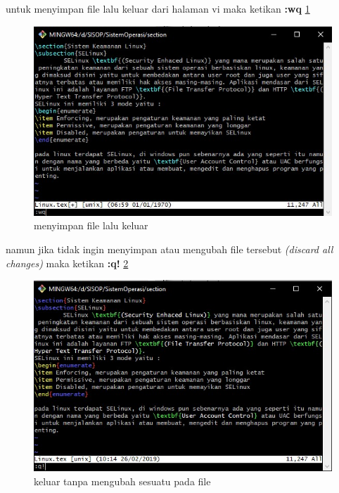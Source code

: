 \begin{enumerate}
\subitem untuk menyimpan file lalu keluar dari halaman vi maka ketikan \textbf{:wq} \ref{wq}
\begin{figure}[!htbp]
\centerline{\includegraphics[width=.75\textwidth]{Figures/vi4.jpg}}
\caption{menyimpan file lalu keluar}
\label{wq}
\end{figure}

\subitem namun jika tidak ingin menyimpan atau mengubah file tersebut \textit{(discard all changes)} maka ketikan \textbf{:q!} \ref{q}
\begin{figure}[!htbp]
\centerline{\includegraphics[width=.75\textwidth]{Figures/vi(q).jpg}}
\caption{keluar tanpa mengubah sesuatu pada file}
\label{q}
\end{figure}
\end{enumerate}


